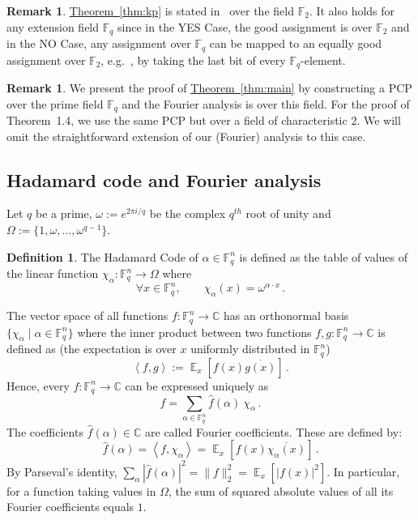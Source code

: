 \documentclass[10pt]{article}
\theoremstyle{definition}
\newtheorem{definition}[theorem]{Definition}
\newtheorem{remark}[theorem]{Remark}
\providecommand{\eg}{e.g.\ }
\numberwithin{equation}{section}
\newcommand{\expref}[2]{\texorpdfstring{\hyperref[#2]{#1~\ref{#2}}}{#1~\ref{#2}}}
\newcommand\F{\mathbb{F}}
\DeclareMathOperator*\Exp{\mathbb{E}}
\renewcommand{\mapsto}{\to}
\begin{document}
\begin{remark} \expref{Theorem}{thm:kp} is stated in~\cite{KhotPonnuswami} over the field $\F_2$. It also holds
for any extension field $\F_q$ since in the YES Case, the good assignment is over
$\F_2$ and in the NO Case, any assignment over $\F_q$ can be mapped
to an equally good assignment over $\F_2$, \eg, by taking the last bit of
every $\F_q$-element.
\end{remark}


\begin{remark} We present the proof of \expref{Theorem}{thm:main} by constructing a PCP over the prime field $\F_q$ and the Fourier analysis is over
this field. For the proof of Theorem~1.4, we use the same PCP but over
a field of characteristic $2$. We will omit the straightforward extension of our (Fourier) analysis to this case.
\end{remark}



\subsection{Hadamard code and Fourier analysis}

Let $q$ be a prime,   $\omega := e^{2\pi i/q}$ be the complex
$q^{th}$ root of unity and $\Omega := \{1, \omega, \ldots,
\omega^{q-1} \}$.

\begin{definition} 
%
%
The
%
Hadamard Code of $\alpha \in \F_q^n$ is defined
as the table of values of the linear function
 $\chi_\alpha: \F_q^n \mapsto \Omega$ where
  $$\forall x \in \F_q^n, \qquad  \chi_\alpha (x) = \omega^{\alpha \cdot  x}\,. $$
\end{definition}

The vector space of all functions $f : \F_q^n \mapsto {\mathbb C}$
has an orthonormal basis $\{ \chi_\alpha \mid \alpha \in \F_q^n\}$
where the inner product between two functions $f,g : \F_q^n \mapsto {\mathbb C}$ is defined as
(the expectation is over $x$ uniformly distributed in $\F_q^n$)
 $$ \left< f,g  \right> := \Exp_{x } \left[ f(x) \overline{g(x)}
 \right]\,. $$
Hence, every $f: \F_q^n \mapsto {\mathbb C}$ can be expressed
uniquely as
 $$ f = \sum_{\alpha \in \F_q^n}  \widehat{f}(\alpha) \ \chi_\alpha\,.
 $$
The coefficients $\widehat{f}(\alpha) \in {\mathbb C}$ are called
Fourier coefficients. These are defined by:
 $$ \widehat{f} (\alpha) = \left<f, \chi_\alpha \right> = \Exp_{x} \left[ f(x) \overline{\chi_\alpha(x)}
 \right]\,. $$
By Parseval's identity, $\sum_\alpha | \widehat{f}(\alpha)|^2
 = \| f\|_2^2 = \Exp_x [ |f(x)|^2]. $ In particular, for a function taking values in $\Omega$,
the sum of squared absolute values of all its Fourier coefficients equals $1$.
\end{document}
